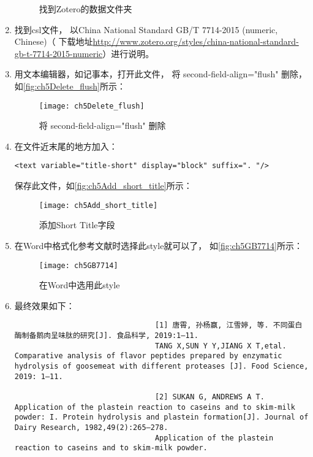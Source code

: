 \documentclass[cn,11pt,chinese]{elegantbook}
\begin{document}
\begin{enumerate}
\begin{figure}[ht]
								\caption{找到Zotero的数据文件夹}
								\label{fig:ch5Styles}
							\end{figure}
						\item 找到csl文件，
							以China National Standard GB/T 7714-2015 
							(numeric, Chinese)（
							下载地址\url{http://www.zotero.org/styles/china-national-standard-gb-t-7714-2015-numeric}）进行说明。
						\item 	用文本编辑器，如记事本，打开此文件，
							将 second-field-align="flush" 删除，如\autoref{fig:ch5Delete_flush}所示：
							\begin{figure}[ht]
								\centering
								\texttt{[image: ch5Delete\_flush]}
								\caption{将 second-field-align="flush" 删除}
								\label{fig:ch5Delete_flush}
							\end{figure}
						\item 在文件近末尾的地方加入：
							\begin{lstlisting}[language=VBScript]
								<text variable="title-short" display="block" suffix=". "/>
							\end{lstlisting}
							保存此文件，如\autoref{fig:ch5Add_short_title}所示：
								\begin{figure}[ht]
									\centering
									\texttt{[image: ch5Add\_short\_title]}
									\caption{添加Short Title字段}
									\label{fig:ch5Add_short_title}
								\end{figure}
						\item 在Word中格式化参考文献时选择此style就可以了，
						如\autoref{fig:ch5GB7714}所示：
							\begin{figure}[ht]
								\centering
								\texttt{[image: ch5GB7714]}
								\caption{在Word中选用此style}
								\label{fig:ch5GB7714}
							\end{figure}
						\item 最终效果如下：
							\begin{lstlisting}
								[1] 唐霄, 孙杨赢, 江雪婷, 等. 不同蛋白酶制备鹅肉呈味肽的研究[J]. 食品科学, 2019:1–11. 
								TANG X,SUN Y Y,JIANG X T,etal. Comparative analysis of flavor peptides prepared by enzymatic hydrolysis of goosemeat with different proteases [J]. Food Science, 2019: 1–11.
								
								[2] SUKAN G, ANDREWS A T. Application of the plastein reaction to caseins and to skim-milk powder: I. Protein hydrolysis and plastein formation[J]. Journal of Dairy Research, 1982,49(2):265–278. 
								Application of the plastein reaction to caseins and to skim-milk powder.
								

\end{lstlisting}
\end{enumerate}
\end{document}
